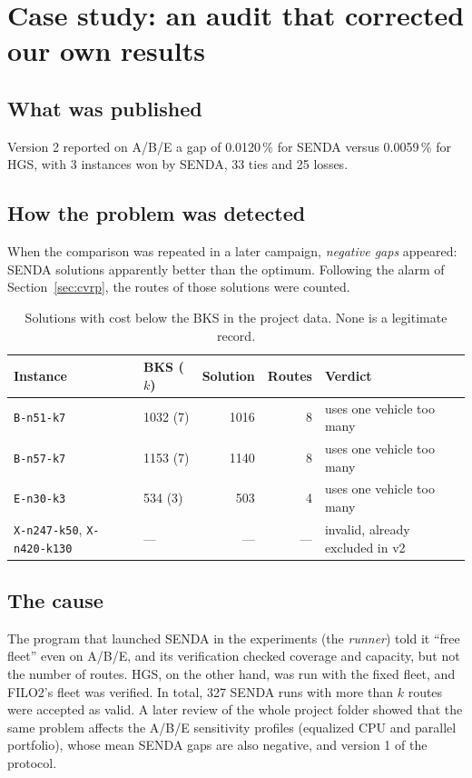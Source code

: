 \documentclass[11pt,a4paper]{article}
\newcommand{\tsl}[1]{\texttt{\small #1}}
\begin{document}
\section{Case study: an audit that corrected our own results}
\label{sec:caso}

\subsection{What was published}
Version 2 reported on A/B/E a gap of 0.0120\,\% for SENDA versus 0.0059\,\% for HGS, with 3 instances
won by SENDA, 33 ties and 25 losses.

\subsection{How the problem was detected}
When the comparison was repeated in a later campaign, \emph{negative gaps} appeared: SENDA solutions
apparently better than the optimum. Following the alarm of Section~\ref{sec:cvrp}, the routes of
those solutions were counted.

\begin{table}[H]
\centering
\caption{Solutions with cost below the BKS in the project data. None is a legitimate record.}
\label{tab:bks}
\small
\begin{tabular}{@{}llrrl@{}}
\toprule
Instance & BKS ($k$) & Solution & Routes & Verdict \\
\midrule
\tsl{B-n51-k7} & 1032 (7) & 1016 & 8 & uses one vehicle too many \\
\tsl{B-n57-k7} & 1153 (7) & 1140 & 8 & uses one vehicle too many \\
\tsl{E-n30-k3} & 534 (3) & 503 & 4 & uses one vehicle too many \\
\tsl{X-n247-k50}, \tsl{X-n420-k130} & --- & --- & --- & invalid, already excluded in v2 \\
\bottomrule
\end{tabular}
\end{table}

\subsection{The cause}
The program that launched SENDA in the experiments (the \emph{runner}) told it ``free fleet'' even on
A/B/E, and its verification checked coverage and capacity, but not the number of routes. HGS, on the
other hand, was run with the fixed fleet, and FILO2's fleet was verified. In total, 327 SENDA runs
with more than $k$ routes were accepted as valid. A later review of the whole project folder showed
that the same problem affects the A/B/E sensitivity profiles (equalized CPU and parallel portfolio),
whose mean SENDA gaps are also negative, and version 1 of the protocol.
\end{document}
